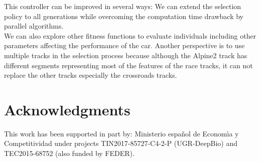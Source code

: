 \documentclass[conference]{IEEEtran}
\begin{document}
This controller can be improved in several ways:
We can extend the selection policy to all generations while overcoming the computation time drawback by parallel algorithms.\\
We can also explore other fitness functions to evaluate individuals including other parameters affecting the performance of the car.
Another perspective is to use multiple tracks in the selection process because although the Alpine2 track has different segments representing most of the features of the race tracks, it can not replace the other tracks especially the crossroads tracks.
\section*{Acknowledgments}

This work has been supported in part by: Ministerio espa\~{n}ol de
Econom\'{\i}a y Competitividad under projects  TIN2017-85727-C4-2-P (UGR-DeepBio) and TEC2015-68752 (also funded by FEDER).



\end{document}
